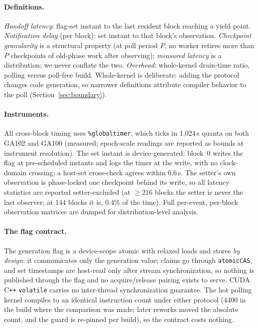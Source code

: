 \documentclass[11pt]{article}
\newcommand{\us}{\,\textmu s\xspace}
\begin{document}
\paragraph{Definitions.} \emph{Handoff latency}: flag-set instant to
the last resident block reaching a yield point. \emph{Notification
delay} (per block): set instant to that block's observation.
\emph{Checkpoint granularity} is a structural property (at poll
period $P$, no worker retires more than $P$ checkpoints of old-phase
work after observing); \emph{measured latency} is a distribution; we
never conflate the two. \emph{Overhead}: whole-kernel drain-time
ratio, polling versus poll-free build. Whole-kernel is deliberate:
adding the protocol changes code generation, so narrower definitions
attribute compiler behavior to the poll
(Section~\ref{sec:boundary}).

\paragraph{Instruments.} All cross-block timing uses
\texttt{\%globaltimer}, which ticks in 1.024\us{} quanta on both
GA102 and GA100 (measured; epoch-scale readings are reported as
bounds at instrument resolution). The set instant is
device-generated: block~0 writes the flag at pre-scheduled instants
and logs the timer at the write, with no clock-domain crossing; a
host-set cross-check agrees within 0.6\us. The setter's own
observation is phase-locked one checkpoint behind its write, so all
latency statistics are reported setter-excluded (at ${\ge}216$ blocks
the setter is never the last observer; at 144 blocks it is, 0.4\% of
the time). Full per-event, per-block observation matrices are dumped
for distribution-level analysis.

\paragraph{The flag contract.} The generation flag is a device-scope
atomic with relaxed loads and stores \emph{by design}: it
communicates only the generation value; claims go through
\texttt{atomicCAS}, and set timestamps are host-read only after
stream synchronization, so nothing is published through the flag and
no acquire/release pairing exists to serve. CUDA C\texttt{++}
\texttt{volatile} carries no inter-thread synchronization guarantee.
The hot polling kernel compiles to an identical instruction count
under either protocol (4400 in the build where the comparison was
made; later reworks moved the absolute count, and the guard is
re-pinned per build), so the contract costs nothing.
\end{document}
